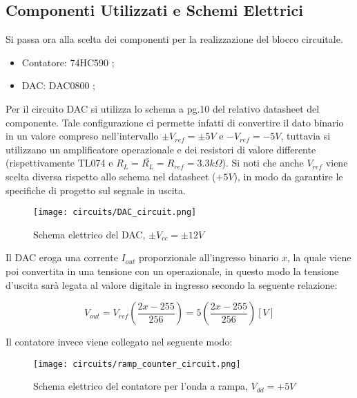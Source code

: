 \subsection*{Componenti Utilizzati e Schemi Elettrici}


Si passa ora alla scelta dei componenti per la realizzazione del blocco circuitale.

\begin{itemize}
    \item Contatore: 74HC590 \cite{74hc590};
    \item DAC: DAC0800 \cite{dac0800};
\end{itemize}

Per il circuito DAC si utilizza lo schema a pg.10 del relativo datasheet del componente.
Tale configurazione ci permette infatti di convertire il dato binario in un valore compreso
nell'intervallo $\pm V_{ref}= \pm 5V$ e $-V_{ref}= -5V$, tuttavia si utilizzano un amplificatore
operazionale e dei resistori di valore differente (rispettivamente TL074 \cite{tl074} e
$R_L=\bar{R_L}=R_{ref}=3.3k\Omega$). Si noti che anche $V_{ref}$ viene scelta diversa rispetto
allo schema nel datasheet ($+5V$), in modo da garantire le specifiche di progetto sul segnale
in uscita.
\medskip

\begin{figure}[ht]
    \centering
    \texttt{[image: circuits/DAC\_circuit.png]}
    \caption{Schema elettrico del DAC, $\pm V_{cc}=\pm 12V$}
    \label{DAC_circuit}
\end{figure}

Il DAC eroga una corrente $I_{out}$ proporzionale all'ingresso binario $x$, la quale viene poi
convertita in una tensione con un operazionale, in questo modo la tensione d'uscita sarà
legata al valore digitale in ingresso secondo la seguente relazione:

\begin{displaymath}
    V_{out}=V_{ref}\left(\frac{2x-255}{256}\right)=5\left(\frac{2x-255}{256}\right)[V]
\end{displaymath}

Il contatore invece viene collegato nel seguente modo:
\medskip

\begin{figure}[ht]
    \centering
    \texttt{[image: circuits/ramp\_counter\_circuit.png]}
    \caption{Schema elettrico del contatore per l'onda a rampa, $V_{dd}=+5V$}
    \label{ramp_counter_circuit}
\end{figure}

